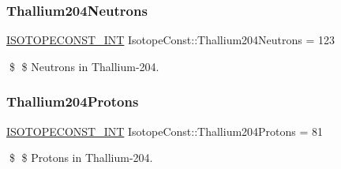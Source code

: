\subsubsection{\texorpdfstring{Thallium204\+Neutrons}{Thallium204Neutrons}}
{\footnotesize\ttfamily \mbox{\hyperlink{group___isotope_const-_macros_ga5f18360b3e99483a35c32d789e62621c}{I\+S\+O\+T\+O\+P\+E\+C\+O\+N\+S\+T\+\_\+\+I\+NT}} Isotope\+Const\+::\+Thallium204\+Neutrons = 123}

\$ \$ Neutrons in Thallium-\/204. \mbox{\label{group___isotope_const-_thallium-_tl204_gad28616567c6cb729d0551e1f9f0ea79f}} 
\subsubsection{\texorpdfstring{Thallium204\+Protons}{Thallium204Protons}}
{\footnotesize\ttfamily \mbox{\hyperlink{group___isotope_const-_macros_ga5f18360b3e99483a35c32d789e62621c}{I\+S\+O\+T\+O\+P\+E\+C\+O\+N\+S\+T\+\_\+\+I\+NT}} Isotope\+Const\+::\+Thallium204\+Protons = 81}

\$ \$ Protons in Thallium-\/204. 